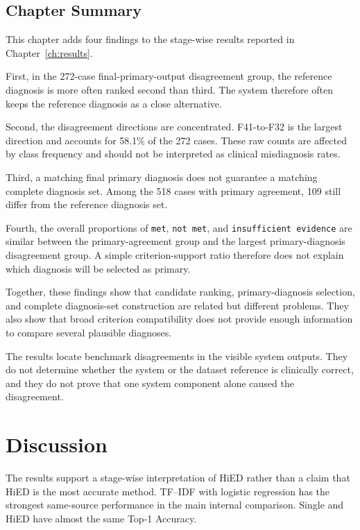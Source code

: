 \documentclass[12pt,a4paper,oneside]{report}
\begin{document}
\section{Chapter Summary}
\label{sec:ch8-summary}

This chapter adds four findings to the stage-wise results reported in
Chapter~\ref{ch:results}.

First, in the 272-case final-primary-output disagreement group, the
reference diagnosis is more often ranked second than third. The system
therefore often keeps the reference diagnosis as a close alternative.

Second, the disagreement directions are concentrated. F41-to-F32 is the
largest direction and accounts for 58.1\% of the 272 cases. These raw
counts are affected by class frequency and should not be interpreted as
clinical misdiagnosis rates.

Third, a matching final primary diagnosis does not guarantee a matching
complete diagnosis set. Among the 518 cases with primary agreement, 109
still differ from the reference diagnosis set.

Fourth, the overall proportions of \texttt{met},
\texttt{not met}, and
\texttt{insufficient evidence} are similar between the
primary-agreement group and the largest primary-diagnosis disagreement
group. A simple criterion-support ratio therefore does not explain which
diagnosis will be selected as primary.

Together, these findings show that candidate ranking, primary-diagnosis
selection, and complete diagnosis-set construction are related but
different problems. They also show that broad criterion compatibility
does not provide enough information to compare several plausible
diagnoses.

The results locate benchmark disagreements in the visible system
outputs. They do not determine whether the system or the dataset
reference is clinically correct, and they do not prove that one system
component alone caused the disagreement.

\chapter{Discussion}
\label{ch:discussion}

The results support a stage-wise interpretation of HiED rather than a
claim that HiED is the most accurate method. TF--IDF with logistic
regression has the strongest same-source performance in the main
internal comparison. Single and HiED have almost the same Top-1
Accuracy.
\end{document}
